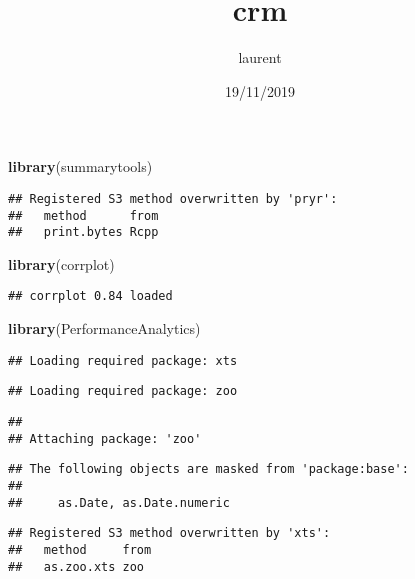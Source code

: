 \documentclass[]{article}
\title{crm}
\author{laurent}
\date{19/11/2019}
\newenvironment{Shaded}{\begin{snugshade}}{\end{snugshade}}
\newcommand{\KeywordTok}[1]{\textcolor[rgb]{0.13,0.29,0.53}{\textbf{#1}}}
\newcommand{\NormalTok}[1]{#1}
\begin{document}
\maketitle

\begin{Shaded}
\begin{Highlighting}[]
\KeywordTok{library}\NormalTok{(summarytools)}
\end{Highlighting}
\end{Shaded}

\begin{verbatim}
## Registered S3 method overwritten by 'pryr':
##   method      from
##   print.bytes Rcpp
\end{verbatim}

\begin{Shaded}
\begin{Highlighting}[]
\KeywordTok{library}\NormalTok{(corrplot)}
\end{Highlighting}
\end{Shaded}

\begin{verbatim}
## corrplot 0.84 loaded
\end{verbatim}

\begin{Shaded}
\begin{Highlighting}[]
\KeywordTok{library}\NormalTok{(PerformanceAnalytics)}
\end{Highlighting}
\end{Shaded}

\begin{verbatim}
## Loading required package: xts
\end{verbatim}

\begin{verbatim}
## Loading required package: zoo
\end{verbatim}

\begin{verbatim}
## 
## Attaching package: 'zoo'
\end{verbatim}

\begin{verbatim}
## The following objects are masked from 'package:base':
## 
##     as.Date, as.Date.numeric
\end{verbatim}

\begin{verbatim}
## Registered S3 method overwritten by 'xts':
##   method     from
##   as.zoo.xts zoo
\end{verbatim}
\end{document}
